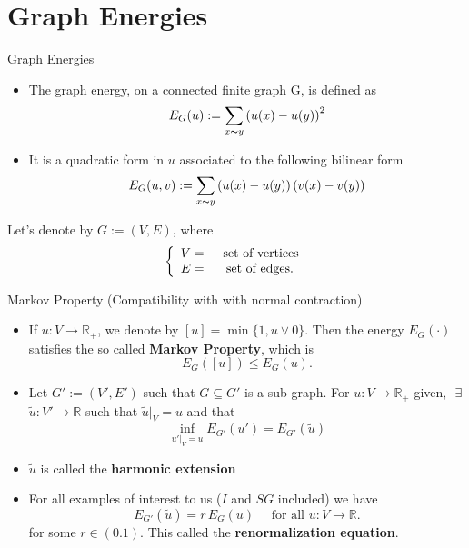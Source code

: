 \section{Graph Energies}
\begin{frame}{Graph Energies}
\begin{itemize}
    \item The graph energy, on a connected finite graph G, is defined as
    \begin{equation}
        E_G(u):=\underset{x \thicksim y}{\sum}\left(u(x)-u(y)\right)^2
    \end{equation}
    
    \item It is a quadratic form in $u$ associated to the following bilinear form
    \begin{equation}
        E_G(u,v):= \underset{x\thicksim y}{\sum}\left(u(x)-u(y)\right)\left(v(x)-v(y)\right)
    \end{equation}
\end{itemize}

Let's denote by $G:=(V,E)$, where
$$
\left\{
\begin{array}{rcl}
   V= &\text{ \,set of vertices}  \\
   E= &\text{ set of edges}.
\end{array}\right.
$$
\end{frame}
\begin{frame}{Markov Property (Compatibility with  with normal contraction)}
\begin{itemize}
    \item If $u:V \rightarrow \mathbb{R}_+$, we denote by $[u]=\min\{1,u\vee 0\}$. Then the energy $E_G(\cdot)$ satisfies the so called \textbf{Markov Property}, which is
    \begin{equation}
    E_G([u])\leq E_G(u).
    \end{equation}
    \item Let $G':=(V',E')$ such that $G\subseteq G'$ is a sub-graph. For $u:V \rightarrow \mathbb{R}_+$ given, $\,\,\exists$ $\tilde{u}: V' \rightarrow \mathbb{R}$ such that $\tilde{u}\lvert_V=u$ and that 
    $$
\underset{u'\lvert_V=u}{\inf}E_{G'}(u')=E_{G'}(\tilde{u})
    $$
\item $\tilde{u}$ is called the \textbf{harmonic extension}

\item For all examples of interest to us ($I$ and $SG$ included) we have
\begin{equation}
    E_{G'}(\tilde{u})=r\,E_G(u) \quad \text{ for all } u: V \rightarrow \mathbb{R}.
\end{equation}
for some $r\in (0.1)$. This called the \textbf{renormalization equation}.
\end{itemize}
\end{frame}

